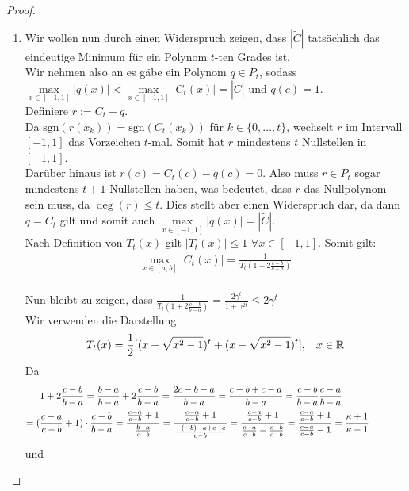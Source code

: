 \documentclass[12pt,a4paper,numbers=endperiod]{scrartcl}
\theoremstyle{definition}
\newcommand{\sgn}{\text{sgn}}
\def\RR{{\mathbb R}}
\begin{document}
\begin{proof}
\begin{enumerate}
	\item
	Wir wollen nun durch einen Widerspruch zeigen, dass $|\tilde{C}|$ tatsächlich das eindeutige Minimum für ein Polynom $t$-ten Grades ist.\\
	Wir nehmen also an es gäbe ein Polynom $q \in P_t$, sodass\\
	 $\max\limits_{x \in [-1, 1]} |q(x)| < \max\limits_{x \in [-1,1]} |C_t(x)| = |\tilde{C}|$ und $q(c) = 1$.\\
	Definiere $r := C_t - q$.\\
	Da $\sgn(r(x_k)) = \sgn(C_t(x_k))$ für $k \in \{0, \ldots, t\}$, wechselt $r$ im Intervall $[-1,1]$ das Vorzeichen $t$-mal. Somit hat $r$ mindestens $t$ Nullstellen in $[-1,1]$.\\ Darüber hinaus ist $r(c) = C_t(c) - q(c) = 0$. Also muss $r \in P_t$ sogar mindestens $t+1$ Nullstellen haben, was bedeutet, dass $r$ das Nullpolynom sein muss, da $\deg(r) \leq t$. Dies stellt aber einen Widerspruch dar, da dann $q = C_t$ gilt und somit auch $\max\limits_{x \in [-1, 1]} |q(x)| = |\tilde{C}|$.\\
	Nach Definition von $T_t(x)$ gilt $|T_t(x)| \leq 1$ $\forall x \in [-1,1]$. Somit gilt:\\
	\begin{gather}
	\max\limits_{x \in [a,b]} |C_t(x)| = \frac{1}{T_t(1 + 2 \frac{c-b}{b-a})}
	\end{gather}\\
	Nun bleibt zu zeigen, dass $\frac{1}{T_t(1 + 2\frac{c-b}{b-a})} = \frac{2 \gamma^t}{1+ \gamma^{2t}} \leq 2 \gamma^t$\\
	Wir verwenden die Darstellung
	\begin{align*}
	T_t(x) = \frac{1}{2} [(x + \sqrt{x^2-1})^t + (x- \sqrt{x^2-1})^t], \hspace{3mm} x \in \RR
	\end{align*}
	Da 
	\begin{align*}
		1 + 2\frac{c-b}{b-a} = \frac{b-a}{b-a} + 2\frac{c-b}{b-a} = \frac{2c-b-a}{b-a} = \frac{c-b+c-a}{b-a} = \frac{c-b}{b-a} \frac{c-a}{b-a}\hspace{30mm}\\ = (\frac{c-a}{c-b} +1)\cdot \frac{c-b}{b-a} = \frac{\frac{c-a}{c-b} +1}{\frac{b-a}{c-b}} = \frac{\frac{c-a}{c-b} +1}{\frac{-(-b)-a+c-c}{c-b}} = \frac{\frac{c-a}{c-b} +1}{\frac{c-a}{c-b} - \frac{c-b}{c-b}} = \frac{\frac{c-a}{c-b} +1}{\frac{c-a}{c-b} - 1} = \frac{\kappa +1}{\kappa -1} \hspace{20mm}
	 \end{align*}
	 und

\end{enumerate}
\end{proof}
\end{document}
